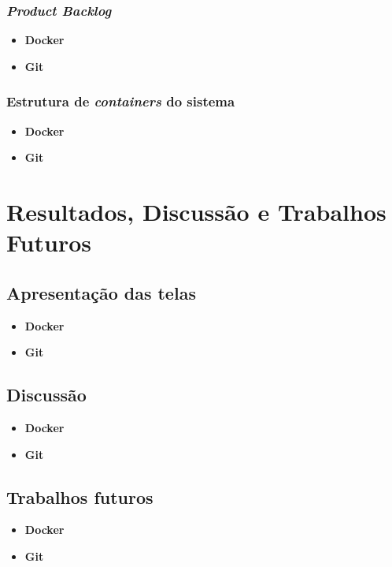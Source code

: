 \documentclass{beamer}
\begin{document}
\begin{frame}
    \frametitle{\textit{Product Backlog}}
    \begin{itemize}
        \item \textbf{Docker}
        \item \textbf{Git}
    \end{itemize}
\end{frame}


\begin{frame}
    \frametitle{Estrutura de \textit{containers} do sistema}
    \begin{itemize}
        \item \textbf{Docker}
        \item \textbf{Git}
    \end{itemize}
\end{frame}


\section{Resultados, Discussão e Trabalhos Futuros}
\subsection{Apresentação das telas}
\begin{frame}
    \begin{itemize}
        \item \textbf{Docker}
        \item \textbf{Git}
    \end{itemize}
\end{frame}


\subsection{Discussão}
\begin{frame}
    \begin{itemize}
        \item \textbf{Docker}
        \item \textbf{Git}
    \end{itemize}
\end{frame}


\subsection{Trabalhos futuros}
\begin{frame}
    \begin{itemize}
        \item \textbf{Docker}
        \item \textbf{Git}
    \end{itemize}

    \cite{gonccalves2005proposta}
        
    \cite{de2003educaccao}

    \cite{Kuruatuba2011}

    \cite{elias}

    \cite{Sommerville}
\end{frame}
\end{document}
